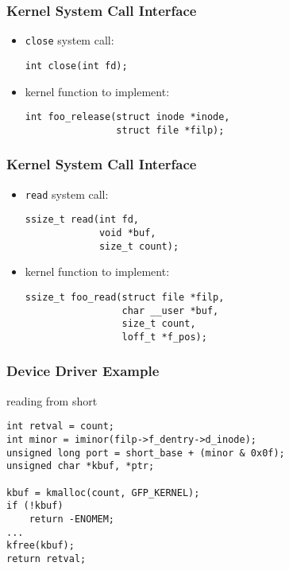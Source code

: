 \documentclass[dvipsnames]{beamer}
\begin{document}
\begin{frame}[fragile]
  \frametitle{Kernel System Call Interface}

  \begin{itemize}
    \item \lstinline|close| system call:
    \begin{lstlisting}
int close(int fd);
    \end{lstlisting}

    \medskip
    \item kernel function to implement:
    \begin{lstlisting}
int foo_release(struct inode *inode,
                struct file *filp);
    \end{lstlisting}
  \end{itemize}
\end{frame}

\begin{frame}[fragile]
  \frametitle{Kernel System Call Interface}

  \begin{itemize}
    \item \lstinline|read| system call:
    \begin{lstlisting}
ssize_t read(int fd,
             void *buf,
             size_t count);
    \end{lstlisting}

    \medskip
    \item kernel function to implement:
    \begin{lstlisting}
ssize_t foo_read(struct file *filp,
                 char __user *buf,
                 size_t count,
                 loff_t *f_pos);
    \end{lstlisting}
  \end{itemize}
\end{frame}

\begin{frame}[fragile]
  \frametitle{Device Driver Example}

  \begin{exampleblock}{reading from short}
    \begin{lstlisting}
int retval = count;
int minor = iminor(filp->f_dentry->d_inode);
unsigned long port = short_base + (minor & 0x0f);
unsigned char *kbuf, *ptr;

kbuf = kmalloc(count, GFP_KERNEL);
if (!kbuf)
    return -ENOMEM;
...
kfree(kbuf);
return retval;
    \end{lstlisting}
  \end{exampleblock}
\end{frame}
\end{document}
